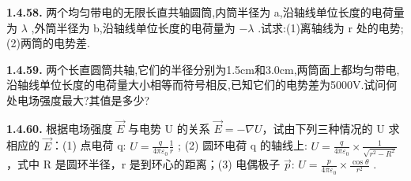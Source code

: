 \vfill

\textbf{1.4.58.} 两个均匀带电的无限长直共轴圆筒,内筒半径为 a,沿轴线单位长度的电荷量为 $\lambda$ ,外筒半径为 b,沿轴线单位长度的电荷量为 $-\lambda$ .试求:(1)离轴线为 r 处的电势;(2)两筒的电势差.

\vfill

\newpage
\textbf{1.4.59.} 两个长直圆筒共轴,它们的半径分别为1.5cm和3.0cm,两筒面上都均匀带电,沿轴线单位长度的电荷量大小相等而符号相反,已知它们的电势差为5000V.试问何处电场强度最大?其值是多少?

\vfill

\textbf{1.4.60.} 根据电场强度 $\vec{E}$ 与电势 U 的关系 $\vec{E} = -\nabla U$，试由下列三种情况的 U 求相应的 $\vec{E}$：(1) 点电荷 q: $\displaystyle U = \frac{q}{4\pi\varepsilon_{0}} \frac{1}{r}$ ; (2) 圆环电荷 q 的轴线上: $\displaystyle U = \frac{q}{4\pi\varepsilon_{0}} \times \frac{1}{\sqrt{r^{2} - R^{2}}}$ ，式中 R 是圆环半径，r 是到环心的距离；(3) 电偶极子 $\vec{p}$: $\displaystyle U = \frac{p}{4\pi\varepsilon_{0}} \times \frac{\cos\theta}{r^{2}}$ .

\vfill

\newpage
